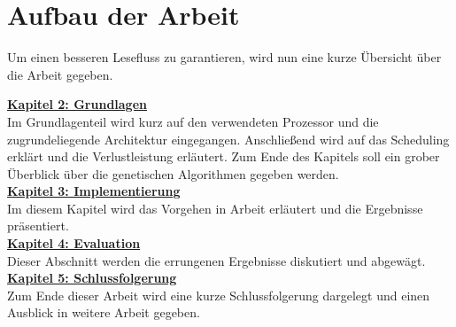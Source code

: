 \section{Aufbau der Arbeit}
\label{sec:structure}
Um einen besseren Lesefluss zu garantieren, wird nun eine kurze Übersicht über die Arbeit gegeben.

\hyperref[chap:grundlagen]{\textbf{Kapitel 2: Grundlagen}}\\Im Grundlagenteil wird kurz auf den verwendeten Prozessor und die zugrundeliegende Architektur eingegangen. Anschließend wird auf das Scheduling erklärt und die Verlustleistung erläutert. Zum Ende des Kapitels soll ein grober Überblick über die genetischen Algorithmen gegeben werden.\\
\hyperref[chap:Implementierung]{\textbf{Kapitel 3: Implementierung}}\\Im diesem Kapitel wird das Vorgehen in Arbeit erläutert und die Ergebnisse präsentiert.\\
\hyperref[chap:evaluation]{\textbf{Kapitel 4: Evaluation}}\\Dieser Abschnitt werden die errungenen Ergebnisse diskutiert und abgewägt.\\
\hyperref[chap:schlussfolgerung]{\textbf{Kapitel 5: Schlussfolgerung}}\\Zum Ende dieser Arbeit wird eine kurze Schlussfolgerung dargelegt und einen Ausblick in weitere Arbeit gegeben.